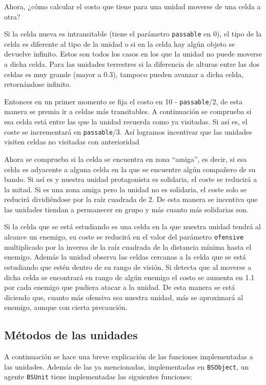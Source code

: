 Ahora, ¿cómo calcular el costo que tiene para una unidad moverse de una celda a otra?
 
Si la celda nueva es intransitable (tiene el parámetro \verb|passable| en 0), el tipo de la celda es diferente al tipo de la unidad o si en la celda hay algún objeto se devuelve infinito. Estos son todos los casos en los que la unidad no puede moverse a dicha celda. Para las unidades terrestres si la diferencia de alturas entre las dos celdas es muy grande (mayor a 0.3), tampoco pueden avanzar a dicha celda, retornándose infinito. 
 
Entonces en un primer momento se fija el costo en 10 - \verb|passable|/2, de esta manera se premia ir a celdas más transitables. A continuación se comprueba si esa celda está entre las que la unidad recuerda como ya visitadas. Si así es, el coste se incrementará en \verb|passable|/3. Así logramos incentivar que las unidades visiten celdas no visitadas con anterioridad  
  
Ahora se comprueba si la celda se encuentra en zona ``amiga'', es decir, si esa celda es adyacente a alguna celda en la que se encuentre algún compañero de su bando. Si así es y nuestra unidad protagonista es solidaria, el coste se reducirá a la mitad. Si es una zona amiga pero la unidad no es solidaria, el coste solo se reducirá dividiéndose por la raíz cuadrada de 2. De esta manera se incentiva que las unidades tiendan a permanecer en grupo y más cuanto más solidarias son.

Si la celda que se est\'a estudiando es una celda en la que nuestra unidad tendr\'a al alcance un enemigo, su coste se reducir\'a en el valor del par\'ametro \verb|ofensive|  multiplicado por la inversa de la ra\'iz cuadrada de la distancia m\'inima hasta el enemigo. Adem\'as la unidad observa las celdas cercanas a la celda que se est\'a estudiando que est\'en dentro de su rango de visi\'on. Si detecta que al moverse a dicha celda se encontrar\'a en rango de alg\'un enemigo el costo se aumenta en 1.1 por cada enemigo que pudiera atacar a la unidad. De esta manera se est\'a diciendo que, cuanto m\'as ofensiva sea nuestra unidad, m\'as se aproximar\'a al enemigo, aunque con cierta precauci\'on.  

\subsection{M\'etodos de las unidades}
A continuaci\'on se hace una breve explicaci\'on de las funciones implementadas a las unidades. Adem\'as de las  ya mencionadas, implementadas en \verb|BSObject|, un agente \verb|BSUnit| tiene implementadas las siguientes funciones:

